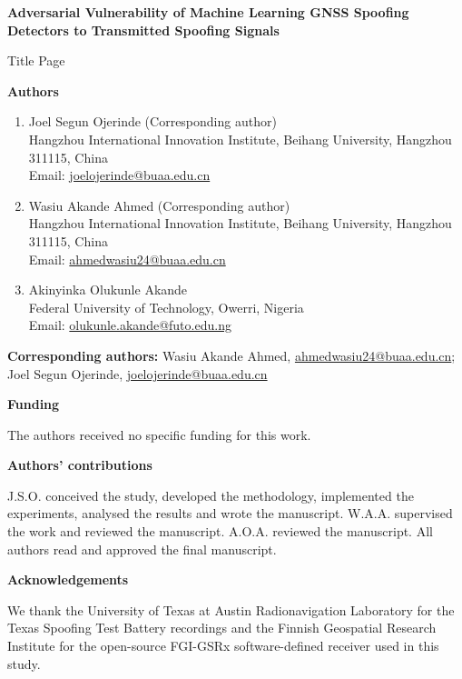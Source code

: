 \documentclass[11pt]{article}
\begin{document}
\begin{center}
{\Large\bfseries Adversarial Vulnerability of Machine Learning GNSS Spoofing Detectors to Transmitted Spoofing Signals}

\vspace{1em}
{\large Title Page}
\end{center}

\vspace{1.5em}
\noindent\textbf{Authors}

\begin{enumerate}
\item Joel Segun Ojerinde (Corresponding author) \\
Hangzhou International Innovation Institute, Beihang University,
Hangzhou 311115, China \\
Email: \href{mailto:joelojerinde@buaa.edu.cn}{joelojerinde@buaa.edu.cn}

\item Wasiu Akande Ahmed (Corresponding author) \\
Hangzhou International Innovation Institute, Beihang University,
Hangzhou 311115, China \\
Email: \href{mailto:ahmedwasiu24@buaa.edu.cn}{ahmedwasiu24@buaa.edu.cn}

\item Akinyinka Olukunle Akande \\
Federal University of Technology, Owerri, Nigeria \\
Email: \href{mailto:olukunle.akande@futo.edu.ng}{olukunle.akande@futo.edu.ng}
\end{enumerate}

\vspace{1em}
\noindent\textbf{Corresponding authors:} Wasiu Akande Ahmed,
\href{mailto:ahmedwasiu24@buaa.edu.cn}{ahmedwasiu24@buaa.edu.cn}; Joel Segun Ojerinde,
\href{mailto:joelojerinde@buaa.edu.cn}{joelojerinde@buaa.edu.cn}

\vspace{1.5em}
\noindent\textbf{Funding}

The authors received no specific funding for this work.

\vspace{1em}
\noindent\textbf{Authors' contributions}

J.S.O. conceived the study, developed the methodology, implemented the experiments,
analysed the results and wrote the manuscript. W.A.A. supervised the work and
reviewed the manuscript. A.O.A. reviewed the manuscript. All authors read and
approved the final manuscript.

\vspace{1em}
\noindent\textbf{Acknowledgements}

We thank the University of Texas at Austin Radionavigation Laboratory for the Texas
Spoofing Test Battery recordings and the Finnish Geospatial Research Institute for
the open-source FGI-GSRx software-defined receiver used in this study.
\end{document}
